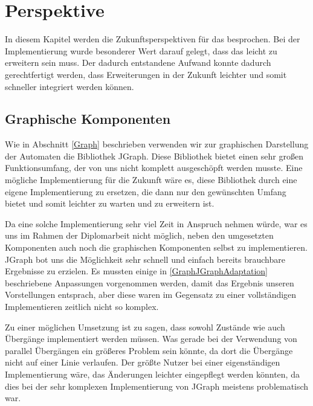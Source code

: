 

\chapter{Perspektive}\label{Perspective}

In diesem Kapitel werden die Zukunftsperspektiven für das \gtitool besprochen.
Bei der Implementierung wurde besonderer Wert darauf gelegt, dass das \gtitool
leicht zu erweitern sein muss. Der dadurch entstandene Aufwand konnte dadurch
gerechtfertigt werden, dass Erweiterungen in der Zukunft leichter und somit
schneller integriert werden können.\vspace{10pt}


\section{Graphische Komponenten}\label{PerspectiveGraphics}

Wie in Abschnitt \ref{Graph} beschrieben verwenden wir zur graphischen
Darstellung der Automaten die Bibliothek JGraph. Diese Bibliothek bietet einen
sehr großen Funktionsumfang, der von uns nicht komplett ausgeschöpft werden
musste. Eine mögliche Implementierung für die Zukunft wäre es, diese Bibliothek
durch eine eigene Implementierung zu ersetzen, die dann nur den gewünschten
Umfang bietet und somit leichter zu warten und zu erweitern ist.\vspace{10pt}

Da eine solche Implementierung sehr viel Zeit in Anspruch nehmen würde, war es
uns im Rahmen der Diplomarbeit nicht möglich, neben den umgesetzten Komponenten
auch noch die graphischen Komponenten selbst zu implementieren. JGraph bot uns
die Möglichkeit sehr schnell und einfach bereits brauchbare Ergebnisse zu
erzielen. Es mussten einige in \ref{GraphJGraphAdaptation} beschriebene
Anpassungen vorgenommen werden, damit das Ergebnis unseren Vorstellungen
entsprach, aber diese waren im Gegensatz zu einer vollständigen Implementieren
zeitlich nicht so komplex.\vspace{10pt}

Zu einer möglichen Umsetzung ist zu sagen, dass sowohl Zustände wie auch
Übergänge implementiert werden müssen. Was gerade bei der Verwendung von parallel
Übergängen ein größeres Problem sein könnte, da dort die Übergänge nicht auf
einer Linie verlaufen. Der größte Nutzer bei einer eigenständigen Implementierung
wäre, das Änderungen leichter eingepflegt werden könnten, da dies bei der sehr
komplexen Implementierung von JGraph meistens problematisch war.\vspace{10pt}

